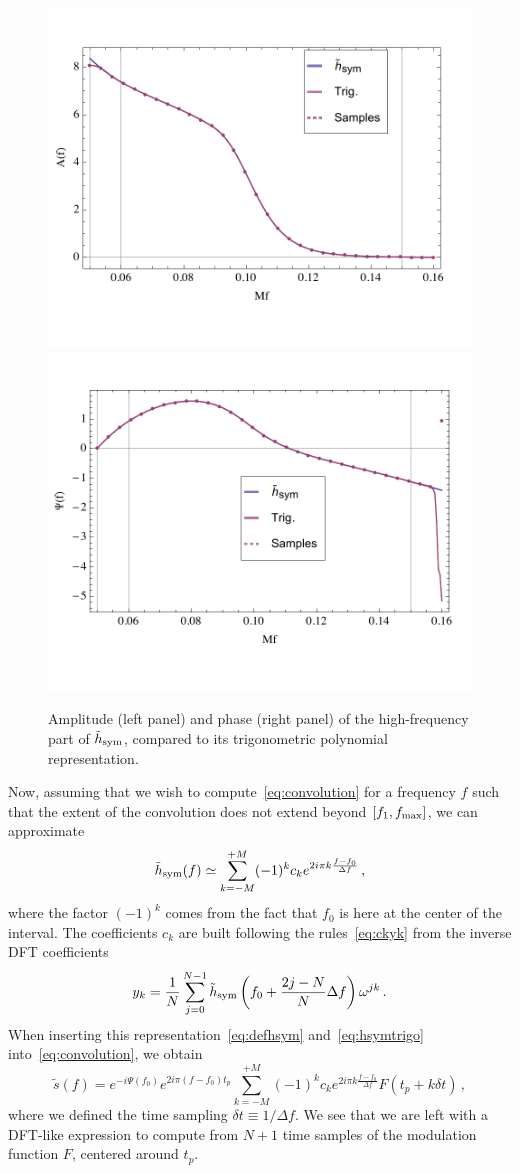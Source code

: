 \documentclass[aps,showpacs,%
prd,superscriptaddress,nofootinbib]{revtex4}
\newcommand{\be}{\begin{equation}}
\newcommand{\ee}{\end{equation}}
\begin{document}
\begin{figure}
  \centering
  \includegraphics[width=.48\linewidth]{plots/trigamp.pdf}
  \hspace{0.2cm}
  \includegraphics[width=.48\linewidth]{plots/trigphase.pdf}
  \caption{Amplitude (left panel) and phase (right panel) of the high-frequency part of $\tilde{h}_{\rm sym}$, compared to its trigonometric polynomial representation.}
  \label{fig:trig}
\end{figure}

Now, assuming that we wish to compute~\eqref{eq:convolution} for a frequency $f$ such that the extent of the convolution does not extend beyond $[f_{1}, f_{\rm max}]$, we can approximate
\be\label{eq:hsymtrigo}
	\tilde{h}_{\rm sym } (f) \simeq \sum\limits_{k=-M}^{+M} (-1)^{k} c_{k} e^{2i\pi k \frac{f-f_{0}}{\Delta f}} \,,
\ee
where the factor $(-1)^{k}$ comes from the fact that $f_{0}$ is here at the center of the interval. The coefficients $c_{k}$ are built following the rules~\eqref{eq:ckyk} from the inverse DFT coefficients
\be\label{eq:ykDFT}
	y_{k} = \frac{1}{N} \sum\limits_{j=0}^{N-1} \tilde{h}_{\rm sym}\left( f_{0} + \frac{2j - N}{N} \Delta f \right) \omega^{jk} \,.
\ee
When inserting this representation~\eqref{eq:defhsym} and~\eqref{eq:hsymtrigo} into~\eqref{eq:convolution}, we obtain
\be\label{eq:resultdirectconvol}
	\tilde{s}(f) = e^{-i \Psi(f_{0})} e^{2i\pi (f-f_{0}) t_{p}} \sum\limits_{k=-M}^{+M} (-1)^{k} c_{k} e^{2i\pi k \frac{f-f_{0}}{\Delta f}} F(t_{p} + k\delta t) \,, 
\ee
where we defined the time sampling $\delta t \equiv 1/\Delta f$. We see that we are left with a DFT-like expression to compute from $N+1$ time samples of the modulation function $F$, centered around $t_{p}$.
\end{document}
